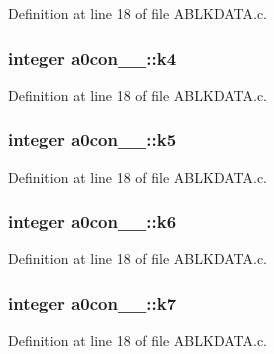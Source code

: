 Definition at line 18 of file A\+B\+L\+K\+D\+A\+T\+A.\+c.

\subsubsection[{\texorpdfstring{k4}{k4}}]{\setlength{\rightskip}{0pt plus 5cm}integer a0con\+\_\+\_\+\+::k4}\hypertarget{structa0con__1___ad293a557a70d975bb6292ff048e5fb0e}{}\label{structa0con__1___ad293a557a70d975bb6292ff048e5fb0e}


Definition at line 18 of file A\+B\+L\+K\+D\+A\+T\+A.\+c.

\subsubsection[{\texorpdfstring{k5}{k5}}]{\setlength{\rightskip}{0pt plus 5cm}integer a0con\+\_\+\_\+\+::k5}\hypertarget{structa0con__1___afb868c8c1fa39876198def4d723be2d2}{}\label{structa0con__1___afb868c8c1fa39876198def4d723be2d2}


Definition at line 18 of file A\+B\+L\+K\+D\+A\+T\+A.\+c.

\subsubsection[{\texorpdfstring{k6}{k6}}]{\setlength{\rightskip}{0pt plus 5cm}integer a0con\+\_\+\_\+\+::k6}\hypertarget{structa0con__1___afc08d6f339d21a9d0d40c9cd71595148}{}\label{structa0con__1___afc08d6f339d21a9d0d40c9cd71595148}


Definition at line 18 of file A\+B\+L\+K\+D\+A\+T\+A.\+c.

\subsubsection[{\texorpdfstring{k7}{k7}}]{\setlength{\rightskip}{0pt plus 5cm}integer a0con\+\_\+\_\+\+::k7}\hypertarget{structa0con__1___a7e875036988993ad9870849778d68358}{}\label{structa0con__1___a7e875036988993ad9870849778d68358}


Definition at line 18 of file A\+B\+L\+K\+D\+A\+T\+A.\+c.

